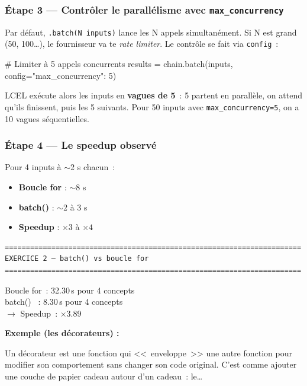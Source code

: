\documentclass[11pt,a4paper]{article}
\begin{document}
\subsubsection*{Étape 3 — Contrôler le parallélisme avec \texttt{max\_concurrency}}

Par défaut, \texttt{.batch(N inputs)} lance les N appels simultanément.
Si N est grand (50, 100\dots), le fournisseur va te \emph{rate limiter}.
Le contrôle se fait via \texttt{config}~:

\begin{pythoncode}
# Limiter à 5 appels concurrents
results = chain.batch(inputs, config={"max_concurrency": 5})
\end{pythoncode}

LCEL exécute alors les inputs en \textbf{vagues de 5}~: 5 partent en
parallèle, on attend qu'ils finissent, puis les 5 suivants. Pour 50
inputs avec \texttt{max\_concurrency=5}, on a 10 vagues séquentielles.

\subsubsection*{Étape 4 — Le speedup observé}

Pour 4 inputs à $\sim$2 s chacun~:
\begin{itemize}[leftmargin=*]
  \item \textbf{Boucle for} : $\sim$8 s
  \item \textbf{batch()}    : $\sim$2 à 3 s
  \item \textbf{Speedup}    : $\times 3$ à $\times 4$
\end{itemize}

\begin{tcolorbox}[
  colback=white,
  colframe=black!50,
  coltitle=black,
  fonttitle=\footnotesize\bfseries,
  fontupper=\footnotesize,
  title=Sortie de l'exécution,
  breakable,
]
\begin{verbatim}
======================================================================
EXERCICE 2 — batch() vs boucle for
======================================================================
\end{verbatim}

Boucle for~: 32.30\,s pour 4 concepts\\
batch()   ~: 8.30\,s pour 4 concepts\\
$\rightarrow$ Speedup~: $\times 3.89$

\textbf{Exemple (les décorateurs) :}

Un décorateur est une fonction qui <<~enveloppe~>> une autre fonction pour
modifier son comportement sans changer son code original. C'est comme
ajouter une couche de papier cadeau autour d'un cadeau~: le\dots
\end{tcolorbox}
\end{document}

